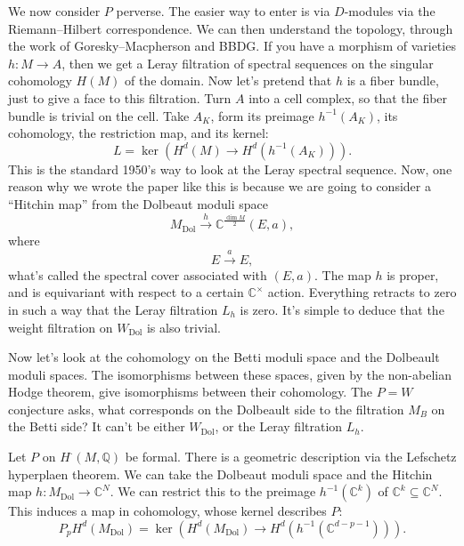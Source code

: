 \documentclass[reqno]{amsart} 
\begin{document}
We now consider $P$ perverse.  The easier way to enter is via $D$-modules via the Riemann--Hilbert correspondence.  We can then understand the topology, through the work of Goresky--Macpherson and BBDG.  If you have a morphism of varieties $h : M \rightarrow A$, then we get a Leray filtration of spectral sequences on the singular cohomology $H(M)$ of the domain.  Now let's pretend that $h$ is a fiber bundle, just to give a face to this filtration.  Turn $A$ into a cell complex, so that the fiber bundle is trivial on the cell.  Take $A_K$, form its preimage $h^{-1}(A_K)$, its cohomology, the restriction map, and its kernel:
\begin{equation*}
  L = \ker \left( H^d(M) \rightarrow H^d(h^{-1}(A_K)) \right).
\end{equation*}
This is the standard 1950's way to look at the Leray spectral sequence.  Now, one reason why we wrote the paper like this is because we are going to consider a ``Hitchin map'' from the Dolbeaut moduli space
\begin{equation*}
  M_{\mathrm{Dol}} \xrightarrow{h} \mathbb{C}^{\frac{\dim M}{2}}(E, a),
\end{equation*}
where
\begin{equation*}
  E \xrightarrow{a} E,
\end{equation*}
what's called the spectral cover associated with $(E, a)$.  The map $h$ is proper, and is equivariant with respect to a certain $\mathbb{C}^\times$ action.  Everything retracts to zero in such a way that the Leray filtration $L_h$ is zero.  It's simple to deduce that the weight filtration on $W_{\mathrm{Dol}}$ is also trivial.

Now let's look at the cohomology on the Betti moduli space and the Dolbeault moduli spaces.  The isomorphisms between these spaces, given by the non-abelian Hodge theorem, give isomorphisms between their cohomology.  The $P = W$ conjecture asks, what corresponds on the Dolbeault side to the filtration $M_B$ on the Betti side?  It can't be either $W_{\mathrm{Dol}}$, or the Leray filtration $L_h$.

Let $P$ on $H^{\cdot}(M, \mathbb{Q})$ be formal.  There is a geometric description via the Lefschetz hyperplaen theorem.  We can take the Dolbeaut moduli space and the Hitchin map $h : M_{\mathrm{Dol}} \rightarrow \mathbb{C}^N$.  We can restrict this to the preimage $h^{-1}(\mathbb{C}^k)$ of $\mathbb{C}^k \subseteq \mathbb{C}^N$.  This induces a map in cohomology, whose kernel describes $P$:
\begin{equation*}
  P_p H^d(M_{\mathrm{Dol}}) = \ker ( H^d(M_{\mathrm{Dol}}) \rightarrow H^d (h^{-1}(\mathbb{C}^{d-p-1}))).
\end{equation*}
\end{document}
